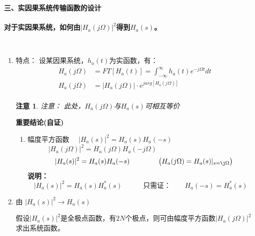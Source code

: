\documentclass[notheorems,compress,mathserif,table]{beamer}
\newtheorem{zhuyi}{注意}
\begin{document}
\begin{frame}[allowframebreaks]\frametitle{}%
\textbf{\heiti 三、实因果系统传输函数的设计}\\
\quad\\
\textbf{对于实因果系统，如何由$|H_a(j\Omega)|^2$得到$H_a(s)$。}

\quad\\
\begin{enumerate}
  \item [1] 特点：
      设某因果系统，$h_a(t)$为实函数，有：
      \begin{equation*} 
        \begin{split}
        H_{a}(j\Omega)&= FT[H_{a}(t)] = \int_{-\infty}^{\infty}h_{a}(t)e^{-j\Omega t}dt \\
         H_{a}(j\Omega)&=|H_{a}(j\Omega)|\cdot e^{jarg[H_{a}(j\Omega)]}\\
        \end{split}
      \end{equation*}
\begin{zhuyi}
\quad\qquad      注意： 此处，$H_a(j\Omega)$与$H_a(s)$可相互等价
\end{zhuyi}
   \newpage

      \textbf{重要结论(自证)}
      \begin{enumerate}
        \item  幅度平方函数  $\quad |H_{a}(s)|^{2}=H_{a}(s)H_{a}(-s)$
            $$|H_{a}(j\Omega)|^{2}=H_{a}(j\Omega)H_{a}(-j\Omega)\quad\quad\quad\quad\quad\quad\quad\quad\quad\quad\quad$$
            $$\quad |H_{a}(s)|^{2}=H_{a}(s)H_{a}(-s)  \quad\quad\quad\quad   \left(H_{a}(j\Omega)= H_{a}(s)|_{s=\j\Omega}\right)$$
            \textbf{说明：}
            $$|H_{a}(s)|^{2}=H_{a}(s)H_{a}^{*}(s)      \quad\quad\quad \mbox{只需证：}\quad\quad    H_{a}(-s)=H_{a}^{*}(s)  $$

      \end{enumerate}



  \item [2]  由
            \quad $|H_{a}(s)|^{2}\rightarrow H_{a}(s)$
            \newline
            \par 假设$|H_{a}(s)|^{2}$是{\heiti 全极点函数}，有$2N$个极点，则可由幅度平方函数$|H_{a}(j\Omega)|^{2}$求出系统函数。


\end{enumerate}
\end{frame}
\end{document}
